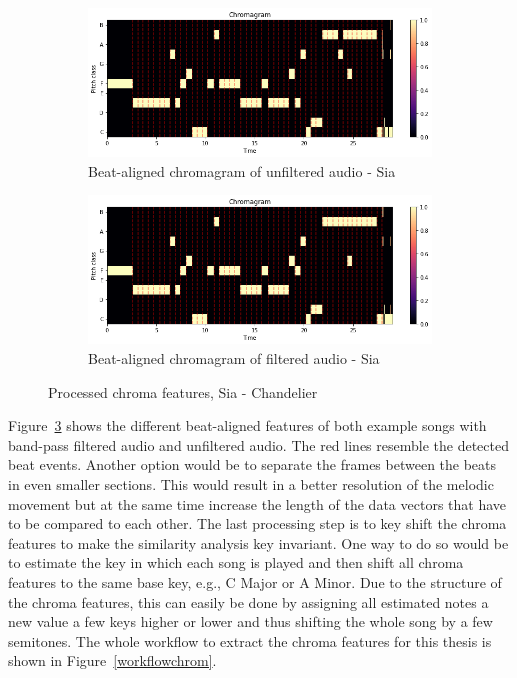 \begin{figure}[htbp]
{{			\begin{subfigure}{.495\textwidth}
				\centering    
				\includegraphics[scale=0.3]{Images/Chroma/siaunfiltered.png}
				\caption{Beat-aligned chromagram of unfiltered audio - Sia}
				\label{siaub}
			\end{subfigure}
			\begin{subfigure}{.495\textwidth}
				\centering     
				\includegraphics[scale=0.3]{Images/Chroma/siafiltered.png}
				\caption{Beat-aligned chromagram of filtered audio - Sia}
				\label{siafb}
			\end{subfigure}%
	}}
	\caption{Processed chroma features, Sia - Chandelier}
	\label{beataligned}
\end{figure}

\noindent Figure~\ref{beataligned} shows the different beat-aligned features of both example songs with band-pass filtered audio and unfiltered audio. The red lines resemble the detected beat events.
\noindent Another option would be to separate the frames between the beats in even smaller sections. This would result in a better resolution of the melodic movement but at the same time increase the length of the data vectors that have to be compared to each other.
\noindent The last processing step is to key shift the chroma features to make the similarity analysis key invariant. One way to do so would be to estimate the key in which each song is played and then shift all chroma features to the same base key, e.g., C Major or A Minor. Due to the structure of the chroma features, this can easily be done by assigning all estimated notes a new value a few keys higher or lower and thus shifting the whole song by a few semitones. The whole workflow to extract the chroma features for this thesis is shown in Figure~\ref{workflowchrom}.\\

